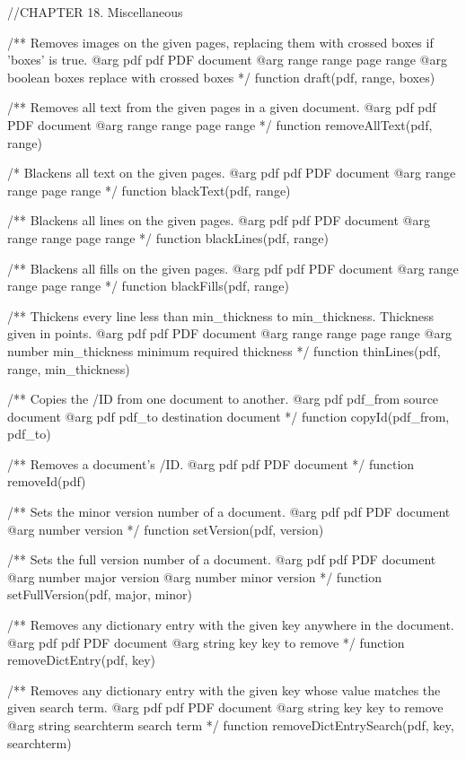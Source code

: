 //CHAPTER 18. Miscellaneous

/** Removes images on the given pages, replacing them with crossed boxes if
'boxes' is true.
@arg {pdf} pdf PDF document
@arg {range} range page range
@arg {boolean} boxes replace with crossed boxes */
function draft(pdf, range, boxes) {}

/** Removes all text from the given pages in a given document.
@arg {pdf} pdf PDF document
@arg {range} range page range */
function removeAllText(pdf, range) {}

/* Blackens all text on the given pages.
@arg {pdf} pdf PDF document
@arg {range} range page range */
function blackText(pdf, range) {}

/** Blackens all lines on the given pages.
@arg {pdf} pdf PDF document
@arg {range} range page range */
function blackLines(pdf, range) {}

/** Blackens all fills on the given pages.
@arg {pdf} pdf PDF document
@arg {range} range page range */
function blackFills(pdf, range) {}

/** Thickens every line less than min_thickness to min_thickness. Thickness
given in points.
@arg {pdf} pdf PDF document
@arg {range} range page range
@arg {number} min_thickness minimum required thickness */
function thinLines(pdf, range, min_thickness) {}

/** Copies the /ID from one document to another.
@arg {pdf} pdf_from source document
@arg {pdf} pdf_to destination document */
function copyId(pdf_from, pdf_to) {}

/** Removes a document's /ID.
@arg {pdf} pdf PDF document */
function removeId(pdf) {}

/** Sets the minor version number of a document.
@arg {pdf} pdf PDF document
@arg {number} version */
function setVersion(pdf, version) {}

/** Sets the full version number of a document.
@arg {pdf} pdf PDF document
@arg {number} major version
@arg {number} minor version */
function setFullVersion(pdf, major, minor) {}

/** Removes any dictionary entry with the given key anywhere in the document.
@arg {pdf} pdf PDF document
@arg {string} key key to remove */
function removeDictEntry(pdf, key) {}

/** Removes any dictionary entry with the given key whose value matches the
given search term.
@arg {pdf} pdf PDF document
@arg {string} key key to remove
@arg {string} searchterm search term */
function removeDictEntrySearch(pdf, key, searchterm) {}

